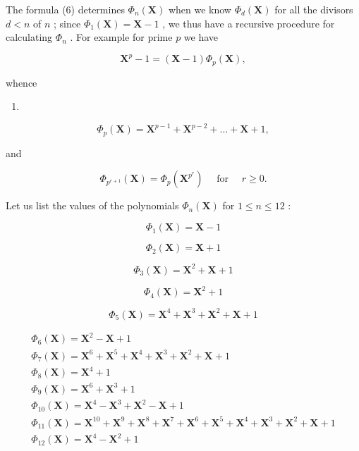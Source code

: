 The formula (6) determines \(\Phi_n(\mathbf{X})\) when we know \(\Phi_d(\mathbf{X})\) for all the divisors \(d < n\) of \(n\) ; since \(\Phi_1(\mathbf{X}) = \mathbf{X} - 1\) , we thus have a recursive procedure for calculating \(\Phi_n\) . For example for prime \(p\) we have

\[
\mathbf {X} ^ {p} - 1 = (\mathbf {X} - 1) \Phi_ {p} (\mathbf {X}),
\]

whence

\begin{enumerate}
\def\labelenumi{(\arabic{enumi})}
\setcounter{enumi}{6}
\tightlist
\item
\end{enumerate}

\[
\Phi_ {p} (\mathbf {X}) = \mathbf {X} ^ {p - 1} + \mathbf {X} ^ {p - 2} + \dots + \mathbf {X} + 1,
\]

and

\[
\Phi_ {p ^ {r + 1}} (\mathbf {X}) = \Phi_ {p} \left(\mathbf {X} ^ {p ^ {r}}\right) \quad \text { for } \quad r \geqslant 0.
\]

Let us list the values of the polynomials \(\Phi_n(\mathbf{X})\) for \(1 \leqslant n \leqslant 12\) :

\[
\Phi_ {1} (\mathbf {X}) = \mathbf {X} - 1
\]

\[
\Phi_ {2} (\mathbf {X}) = \mathbf {X} + 1
\]

\[
\Phi_ {3} (\mathbf {X}) = \mathbf {X} ^ {2} + \mathbf {X} + 1
\]

\[
\Phi_ {4} (\mathbf {X}) = \mathbf {X} ^ {2} + 1
\]

\[
\Phi_ {5} (\mathbf {X}) = \mathbf {X} ^ {4} + \mathbf {X} ^ {3} + \mathbf {X} ^ {2} + \mathbf {X} + 1
\]

\[
\begin{array}{l} \Phi_ {6} (\mathbf {X}) = \mathbf {X} ^ {2} - \mathbf {X} + 1 \\ \Phi_ {7} (\mathbf {X}) = \mathbf {X} ^ {6} + \mathbf {X} ^ {5} + \mathbf {X} ^ {4} + \mathbf {X} ^ {3} + \mathbf {X} ^ {2} + \mathbf {X} + 1 \\ \Phi_ {8} (\mathbf {X}) = \mathbf {X} ^ {4} + 1 \\ \Phi_ {9} (\mathbf {X}) = \mathbf {X} ^ {6} + \mathbf {X} ^ {3} + 1 \\ \Phi_ {1 0} (\mathbf {X}) = \mathbf {X} ^ {4} - \mathbf {X} ^ {3} + \mathbf {X} ^ {2} - \mathbf {X} + 1 \\ \Phi_ {1 1} (\mathbf {X}) = \mathbf {X} ^ {1 0} + \mathbf {X} ^ {9} + \mathbf {X} ^ {8} + \mathbf {X} ^ {7} + \mathbf {X} ^ {6} + \mathbf {X} ^ {5} + \mathbf {X} ^ {4} + \mathbf {X} ^ {3} + \mathbf {X} ^ {2} + \mathbf {X} + 1 \\ \Phi_ {1 2} (\mathbf {X}) = \mathbf {X} ^ {4} - \mathbf {X} ^ {2} + 1 \end{array}
\]

